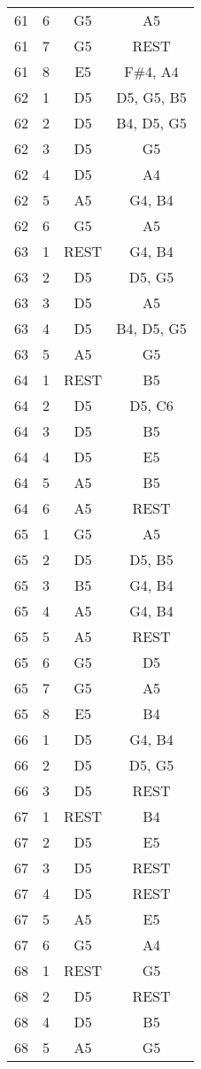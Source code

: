 \documentclass{article}
\begin{document}
\begin{longtable}{|c|c|c|c|}
61 & 6 & G5 & A5 \\ 
61 & 7 & G5 & REST \\ 
61 & 8 & E5 & F\#4, A4 \\ 
\hline
62 & 1 & D5 & D5, G5, B5 \\ 
62 & 2 & D5 & B4, D5, G5 \\ 
62 & 3 & D5 & G5 \\ 
62 & 4 & D5 & A4 \\ 
62 & 5 & A5 & G4, B4 \\ 
62 & 6 & G5 & A5 \\ 
\hline
63 & 1 & REST & G4, B4 \\ 
63 & 2 & D5 & D5, G5 \\ 
63 & 3 & D5 & A5 \\ 
63 & 4 & D5 & B4, D5, G5 \\ 
63 & 5 & A5 & G5 \\ 
\hline
64 & 1 & REST & B5 \\ 
64 & 2 & D5 & D5, C6 \\ 
64 & 3 & D5 & B5 \\ 
64 & 4 & D5 & E5 \\ 
64 & 5 & A5 & B5 \\ 
64 & 6 & A5 & REST \\ 
\hline
65 & 1 & G5 & A5 \\ 
65 & 2 & D5 & D5, B5 \\ 
65 & 3 & B5 & G4, B4 \\ 
65 & 4 & A5 & G4, B4 \\ 
65 & 5 & A5 & REST \\ 
65 & 6 & G5 & D5 \\ 
65 & 7 & G5 & A5 \\ 
65 & 8 & E5 & B4 \\ 
\hline
66 & 1 & D5 & G4, B4 \\ 
66 & 2 & D5 & D5, G5 \\ 
66 & 3 & D5 & REST \\ 
\hline
67 & 1 & REST & B4 \\ 
67 & 2 & D5 & E5 \\ 
67 & 3 & D5 & REST \\ 
67 & 4 & D5 & REST \\ 
67 & 5 & A5 & E5 \\ 
67 & 6 & G5 & A4 \\ 
\hline
68 & 1 & REST & G5 \\ 
68 & 2 & D5 & REST \\ 
68 & 4 & D5 & B5 \\ 
68 & 5 & A5 & G5 \\ 

\end{longtable}
\end{document}
